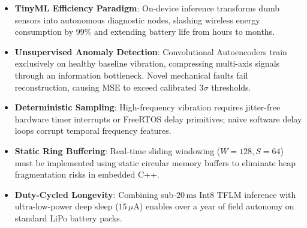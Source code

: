 \begin{takeaways}
\begin{itemize}
    \item \textbf{TinyML Efficiency Paradigm}: On-device inference transforms dumb sensors into autonomous diagnostic nodes, slashing wireless energy consumption by $99\%$ and extending battery life from hours to months.
    \item \textbf{Unsupervised Anomaly Detection}: Convolutional Autoencoders train exclusively on healthy baseline vibration, compressing multi-axis signals through an information bottleneck. Novel mechanical faults fail reconstruction, causing MSE to exceed calibrated $3\sigma$ thresholds.
    \item \textbf{Deterministic Sampling}: High-frequency vibration requires jitter-free hardware timer interrupts or FreeRTOS delay primitives; naive software delay loops corrupt temporal frequency features.
    \item \textbf{Static Ring Buffering}: Real-time sliding windowing ($W = 128, S = 64$) must be implemented using static circular memory buffers to eliminate heap fragmentation risks in embedded C++.
    \item \textbf{Duty-Cycled Longevity}: Combining sub-$20\,\text{ms}$ Int8 TFLM inference with ultra-low-power deep sleep ($15\,\mu\text{A}$) enables over a year of field autonomy on standard LiPo battery packs.
\end{itemize}
\end{takeaways}

